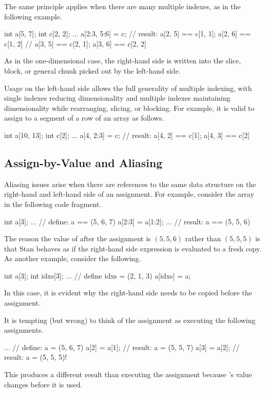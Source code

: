 The same principle applies when there are many multiple indexes, as
in the following example.
%
\begin{stancode}
int a[5, 7];
int c[2, 2];
...
a[2:3, 5:6] = c;  // result: a[2, 5] == c[1, 1];  a[2, 6] == c[1, 2]
                   //         a[3, 5] == c[2, 1];  a[3, 6] == c[2, 2]
\end{stancode}
%
As in the one-dimensional case, the right-hand side is written into
the slice, block, or general chunk picked out by the left-hand side.

Usage on the left-hand side allows the full generality of multiple
indexing, with single indexes reducing dimensionality and multiple
indexes maintaining dimensionality while rearranging, slicing, or
blocking.  For example, it is valid to assign to a segment of a row of
an array as follows.
%
\begin{stancode}
int a[10, 13];
int c[2];
...
a[4, 2:3] = c;  // result:  a[4, 2] == c[1];  a[4, 3] == c[2]
\end{stancode}

\subsection{Assign-by-Value and Aliasing}

Aliasing issues arise when there are references to the same data
structure on the right-hand and left-hand side of an assignment.  For
example, consider the array  in the following code fragment.
%
\begin{stancode}
int a[3];
...                // define: a == (5, 6, 7)
a[2:3] = a[1:2];
...                // result: a == (5, 5, 6) 
\end{stancode}
%
The reason the value of  after the assignment is $(5,5,6)$
rather than $(5,5,5)$ is that Stan behaves as if the right-hand side
expression is evaluated to a fresh copy.   As another example,
consider the following.
%
\begin{stancode}
int a[3];
int idxs[3];
...            // define idxs = (2, 1, 3)
a[idxs] = a;
\end{stancode}
%
In this case, it is evident why the right-hand side needs to be copied
before the assignment.

It is tempting (but wrong) to think of the assignment  as executing the following assignments.
%
\begin{stancode}
...                // define: a = (5, 6, 7)
a[2] = a[1];      // result: a = (5, 5, 7)
a[3] = a[2];      // result: a = (5, 5, 5)!
\end{stancode}
%
This produces a different result than executing the assignment because
's value changes before it is used.



